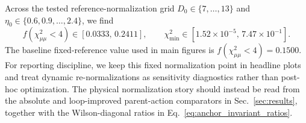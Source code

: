 \documentclass[aps,prd,onecolumn,notitlepage,nofootinbib,superscriptaddress,11pt,floatfix]{revtex4-2}
\begin{document}
Across the tested reference-normalization grid $D_0\in\{7,\dots,13\}$ and $\eta_0\in\{0.6,0.9,\dots,2.4\}$, we find
\begin{equation}
f(\chi^2_{\mu\mu}<4)\in[0.0333,\,0.2411],\qquad
\chi^2_{\min}\in[1.52\times10^{-5},\,7.47\times10^{-1}].
\end{equation}
The baseline fixed-reference value used in main figures is $f(\chi^2_{\mu\mu}<4)=0.1500$.
For reporting discipline, we keep this fixed normalization point in headline plots and treat dynamic re-normalizations as sensitivity diagnostics rather than post-hoc optimization. The physical normalization story should instead be read from the absolute and loop-improved parent-action comparators in Sec.~\ref{sec:results}, together with the Wilson-diagonal ratios in Eq.~\eqref{eq:anchor_invariant_ratios}.
\end{document}
